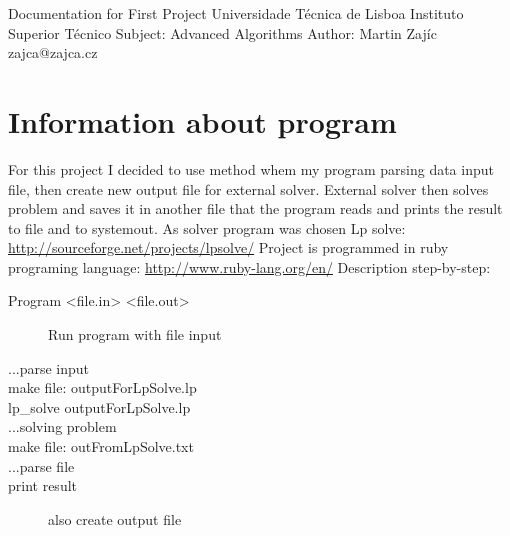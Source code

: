 \documentclass[a4paper,12pt]{article}
\begin{document}
\begin{titlepage}
\begin{center}
Documentation for First Project\newline
\newline
Universidade Técnica de Lisboa\newline
Instituto Superior Técnico\newline
\newline
Subject: Advanced Algorithms\newline
Author: Martin Zajíc zajca@zajca.cz\newline
\newline
\end{center}
\end{titlepage}
\section{Information about program}
For this project I decided to use method whem my program parsing data input file, then create new output file for external solver. External solver then solves problem and saves it in another file that the program reads and prints the result to file and to systemout.
\newline
\newline
As solver program was chosen Lp solve: \href{http://sourceforge.net/projects/lpsolve/}{http://sourceforge.net/projects/lpsolve/}
\newline
\newline
Project is programmed in ruby programing language: \href{http://www.ruby-lang.org/en/}{http://www.ruby-lang.org/en/}
\newline
\newline
Description step-by-step:
\begin{description}
 \item[Program <file.in> <file.out>] Run program with file input
 \item[...parse input]
 \item[make file: outputForLpSolve.lp]
 \item[lp\_solve outputForLpSolve.lp]
 \item[...solving problem]
 \item[make file: outFromLpSolve.txt]
 \item[...parse file]
 \item[print result] also create output file
 \end{description}
\end{document}
